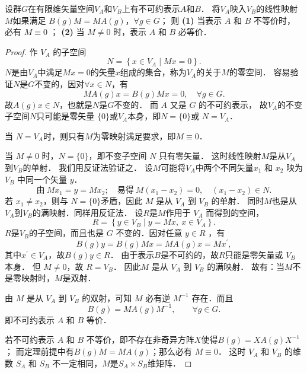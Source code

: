 \begin{theorem}\label{chlar:thm_schur-lemma-1}
	设群$G$在有限维矢量空间$V_A$和$V_B$上有不可约表示$A$和$B$．
	将$V_A$映入$V_B$的线性映射$M$如果满足
	$B\left(g\right) M=M A\left(g\right)$，$\forall g \in G$；	则
	{\bfseries (1)} 当表示 $A$ 和 $B$ 不等价时，必有 $M \equiv 0$ ；
	{\bfseries (2)} 当 $M \neq 0$ 时，表示 $A$ 和 $B$ 必等价．
\end{theorem}
\begin{proof}
	作 $V_A$ 的子空间
	\begin{equation*}
		N=\left\{x \in V_A \mid M x=0\right\} .
	\end{equation*}
	$N$是由$V_A$中满足$M x=0$的矢量$x$组成的集合，称为$V_A$的关于$M$的零空间．
	容易验证$N$是$G$不变的，因对$\forall x \in N$，有
	\begin{equation*}
		M A\left(g\right) x=B\left(g\right) M x=0, \quad \forall g\in G .
	\end{equation*}
	故$A\left(g\right) x \in N$，也就是$N$是$G$不变的．
	而 $A$ 又是 $G$ 的不可约表示，
	故$V_A$的不变子空间$N$只可能是零矢量 $\{0\}$或$V_A$本身，即$N=\{0\}$或 $N=V_A$．
	
	当 $N=V_A$时，则只有$M$为零映射满足要求，即$M \equiv 0$．
	
	当 $M \neq 0$ 时，$N=\{0\}$，即不变子空间 $N$ 只有零矢量．
	这时线性映射$M$是从$V_A$到$V_B$的单射． 我们用反证法验证之．
	设$M$可能将$V_A$中两个不同矢量$x_1$ 和 $x_2$ 映为 $V_B$ 中同一个矢量 $y$．
	\begin{equation*}
		\text{由} \  M x_1=y= M x_2; \quad \text{易得}\ 
		M\left(x_1-x_2\right)=0, \quad\left(x_1-x_2\right) \in N.
	\end{equation*}
	若 $x_1 \neq x_2$，则与 $N=\{0\}$矛盾，因此 $M$ 是从 $V_A$ 到 $V_B$ 的单射．
	同时$M$也是从$V_A$到$V_B$的满映射．同样用反证法．
	设$R$是$M$作用于 $V_A$ 而得到的空间，
	\begin{equation*}
		R=\left\{y \in V_B \mid y=M x,\  x \in V_A\right\} .
	\end{equation*}
	$R$是$V_B$的子空间，而且也是 $G$ 不变的．因对任意 $y \in R$ ，有
	\begin{equation*}
		B\left(g\right) y=B\left(g\right) M x=M A\left(g\right) x=M x^{\prime},
	\end{equation*}
	其中$x^{\prime} \in V_A$，故$B\left(g\right) y \in R $．
	由于表示$B$是不可约的，故$R$只能是零矢量或 $V_B$ 本身．
	但 $M \neq 0$，故 $R=V_B$．
	因此$M$ 是从 $V_A$ 到 $V_B$ 的满映射．
	故有：当$M$不是零映射时，$M$是双射．
	
	由 $M$ 是从 $V_A$ 到 $V_B$ 的双射，可知 $M$ 必有逆 $M^{-1}$ 存在．而且
	\begin{equation*}
		B\left(g\right)=M A\left(g\right) M^{-1},  \qquad \forall g\in G.
	\end{equation*}
	即不可约表示 $A$ 和 $B$ 等价．
	
	
	若不可约表示 $A$ 和 $B$ 不等价，即不存在非奇异方阵$X$使得$B(g)=X A(g) X^{-1}$；
	而定理前提中有$B(g) M=M A(g)$；那么必有 $M \equiv 0$．
	这时 $V_A$ 和 $V_B$ 的维数 $S_A$ 和 $S_B$ 不一定相同，$M$是$S_A \times S_B$维矩阵．
\end{proof}

